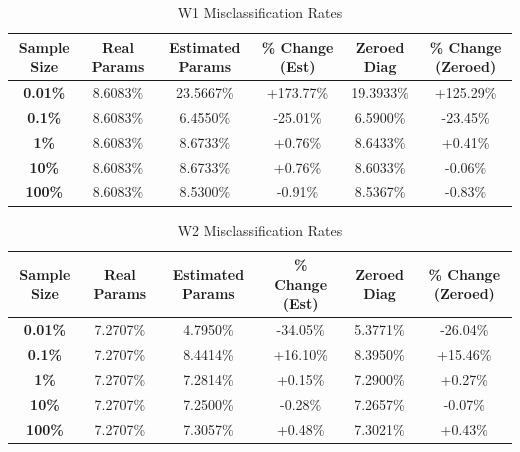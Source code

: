 \documentclass{article}
\begin{document}
\begin{table}[H]
\centering
\small
\caption{W1 Misclassification Rates}
\vspace{0.5em}
\begin{tabular}{cccccc}
\toprule
\textbf{Sample Size} & \textbf{Real Params} & \textbf{Estimated Params} & \textbf{\% Change (Est)} & \textbf{Zeroed Diag} & \textbf{\% Change (Zeroed)} \\
\midrule
\textbf{0.01\%} & 8.6083\% & 23.5667\% & \cellcolor{greatworsened}\color{white} +173.77\% & 19.3933\% & \cellcolor{greatworsened}\color{white} +125.29\% \\
\textbf{0.1\%} & 8.6083\% & 6.4550\% & \cellcolor{greatimproved} -25.01\% & 6.5900\% & \cellcolor{greatimproved} -23.45\% \\
\textbf{1\%} & 8.6083\% & 8.6733\% & \cellcolor{worsened} +0.76\% & 8.6433\% & \cellcolor{negchange} +0.41\% \\
\textbf{10\%} & 8.6083\% & 8.6733\% & \cellcolor{worsened} +0.76\% & 8.6033\% & \cellcolor{negchange} -0.06\% \\
\textbf{100\%} & 8.6083\% & 8.5300\% & \cellcolor{improved} -0.91\% & 8.5367\% & \cellcolor{improved} -0.83\% \\
\bottomrule
\end{tabular}
\end{table}

\begin{table}[H]
\centering
\small
\caption{W2 Misclassification Rates}
\vspace{0.5em}
\begin{tabular}{cccccc}
\toprule
\textbf{Sample Size} & \textbf{Real Params} & \textbf{Estimated Params} & \textbf{\% Change (Est)} & \textbf{Zeroed Diag} & \textbf{\% Change (Zeroed)} \\
\midrule
\textbf{0.01\%} & 7.2707\% & 4.7950\% & \cellcolor{greatimproved} -34.05\% & 5.3771\% & \cellcolor{greatimproved} -26.04\% \\
\textbf{0.1\%} & 7.2707\% & 8.4414\% & \cellcolor{greatworsened}\color{white} +16.10\% & 8.3950\% & \cellcolor{greatworsened}\color{white} +15.46\% \\
\textbf{1\%} & 7.2707\% & 7.2814\% & \cellcolor{negchange} +0.15\% & 7.2900\% & \cellcolor{negchange} +0.27\% \\
\textbf{10\%} & 7.2707\% & 7.2500\% & \cellcolor{negchange} -0.28\% & 7.2657\% & \cellcolor{negchange} -0.07\% \\
\textbf{100\%} & 7.2707\% & 7.3057\% & \cellcolor{negchange} +0.48\% & 7.3021\% & \cellcolor{negchange} +0.43\% \\
\bottomrule
\end{tabular}
\end{table}
\end{document}
